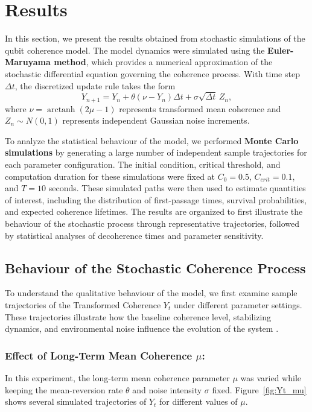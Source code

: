 \documentclass[
	a4paper, %
	10pt, %
	unnumberedsections, %
	twoside, %
]{LTJournalArticle}
\def\[{ \begin{equation} }
\def\]{ \end{equation} }
\begin{document}

\section{Results}

In this section, we present the results obtained from stochastic simulations of the qubit coherence model. The model dynamics were simulated using the \textbf{Euler-Maruyama method}, which provides a numerical approximation of the stochastic differential equation governing the coherence process. With time step $\Delta t$, the discretized update rule takes the form \autocite{HolmesCerfon2026ODE}
\[
Y_{n+1} = Y_n + \theta(\nu - Y_n)\Delta t + \sigma \sqrt{\Delta t}\, Z_n,
\]
where $\nu = \operatorname{arctanh}(2\mu - 1)$ represents transformed mean coherence and $Z_n \sim N(0,1)$ represents independent Gaussian noise increments.

To analyze the statistical behaviour of the model, we performed \textbf{Monte Carlo simulations} by generating a large number of independent sample trajectories for each parameter configuration. The initial condition, critical threshold, and computation duration for these simulations were fixed at $C_0 = 0.5$, $C_{crit} = 0.1$, and $T = 10$ seconds. These simulated paths were then used to estimate quantities of interest, including the distribution of first-passage times, survival probabilities, and expected coherence lifetimes. The results are organized to first illustrate the behaviour of the stochastic process through representative trajectories, followed by statistical analyses of decoherence times and parameter sensitivity.


\subsection{Behaviour of the Stochastic Coherence Process}

To understand the qualitative behaviour of the model, we first examine sample trajectories of the Transformed Coherence $Y_t$ under different parameter settings. These trajectories illustrate how the baseline coherence level, stabilizing dynamics, and environmental noise influence the evolution of the system \autocite{HolmesCerfon2026ODE}.

\subsubsection{Effect of Long-Term Mean Coherence $\mu$:}
In this experiment, the long-term mean coherence parameter $\mu$ was varied while keeping the mean-reversion rate $\theta$ and noise intensity $\sigma$ fixed. Figure~\ref{fig:Yt_mu} shows several simulated trajectories of $Y_t$ for different values of $\mu$.
\end{document}
